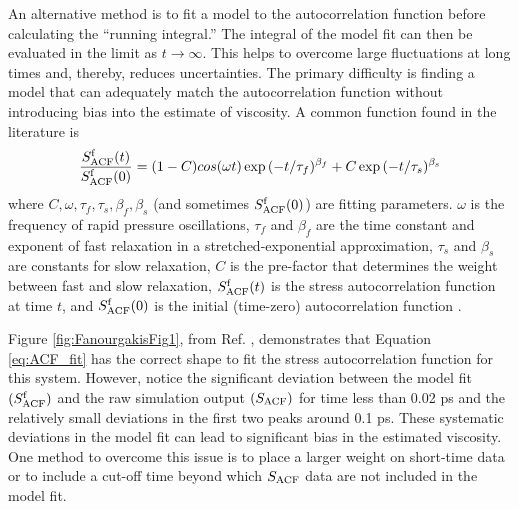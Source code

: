 \documentclass[9pt,bestpractices]{livecoms}
\begin{document}
An alternative method is to fit a model to the autocorrelation function before calculating the ``running integral.'' The integral of the model fit can then be evaluated in the limit as $t \to \infty$. This helps to overcome large fluctuations at long times and, thereby, reduces uncertainties. The primary difficulty is finding a model that can adequately match the autocorrelation function without introducing bias into the estimate of viscosity. A common function found in the literature is
\begin{equation} \label{eq:ACF_fit}
\frac{S^{\rm f}_{\rm ACF}(t)}{S^{\rm f}_{\rm ACF}(0)} = (1-C)cos(\omega t)\exp{(-t/\tau_f)^{\beta_f}} + C\exp{(-t/\tau_s)^{\beta_s}}
\end{equation}
where $C, \omega, \tau_f, \tau_s, \beta_f, \beta_s$ (and sometimes $S^{\rm f}_{\rm ACF}(0)$) are fitting parameters. $\omega$ is the frequency of rapid pressure oscillations, $\tau_f$ and $\beta_f$ are the time constant and exponent of fast relaxation in a stretched-exponential approximation, $\tau_s$ and $\beta_s$ are constants for slow relaxation, $C$ is the pre-factor that determines the weight between fast and slow relaxation, $S^{\rm f}_{\rm ACF}(t)$ is the stress autocorrelation function at time $t$, and $S^{\rm f}_{\rm ACF}(0)$ is the initial (time-zero) autocorrelation function \cite{GROMACS}.


Figure \ref{fig:FanourgakisFig1}, from Ref. \cite{Fanourgakis2012}, demonstrates that Equation \ref{eq:ACF_fit} has the correct shape to fit the stress autocorrelation function for this system. However, notice the significant deviation between the model fit $(S^{\rm f}_{\rm ACF})$ and the raw simulation output $(S_{\rm ACF})$ for time less than 0.02 ps and the relatively small deviations in the first two peaks around 0.1 ps. These systematic deviations in the model fit can lead to significant bias in the estimated viscosity. One method to overcome this issue is to place a larger weight on short-time data or to include a cut-off time beyond which $S_{\rm ACF}$ data are not included in the model fit.
\end{document}
